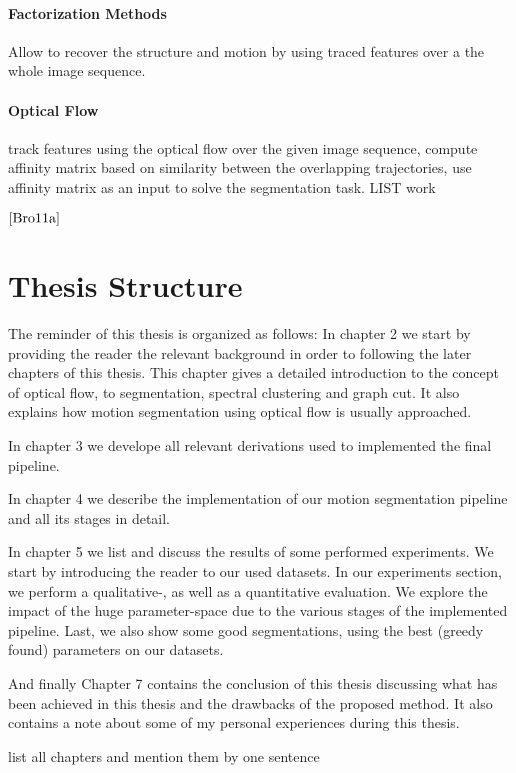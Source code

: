 \paragraph{Factorization Methods} Allow to recover the structure and motion by using traced features over a the whole image sequence.

\paragraph{Optical Flow}
track features using the optical flow over the given image sequence, compute affinity matrix based on similarity between the overlapping trajectories, use affinity matrix as an input to solve the segmentation task. LIST work

$\cite{Bro11a}$

\section{Thesis Structure}

The reminder of this thesis is organized as follows:
In chapter 2 we start by providing the reader the relevant background in order to following the later chapters of this thesis. This chapter gives a detailed introduction to the concept of optical flow, to segmentation, spectral clustering and graph cut. It also explains how motion segmentation using optical flow is usually approached.

In chapter 3 we develope all relevant derivations used to implemented the final pipeline.

In chapter 4 we describe the implementation of our motion segmentation pipeline and all its stages in detail. 

In chapter 5 we list and discuss the results of some performed experiments. We start by introducing the reader to our used datasets. In our experiments section, we perform a qualitative-, as well as a quantitative evaluation. We explore the impact of the huge parameter-space due to the various stages of the implemented pipeline. Last, we also show some good segmentations, using the best (greedy found) parameters on our datasets.

And finally Chapter 7 contains the conclusion of this thesis discussing what has been achieved in this thesis and the drawbacks of the proposed method. It also contains a note about some of my personal experiences during this thesis. 

list all chapters and mention them by one sentence